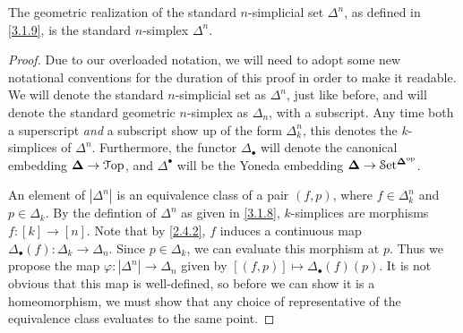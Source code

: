 \begin{proposition}\label{3.2.7}
    The geometric realization of the standard $n$-simplicial set $\Delta^n$, as defined in \cref{3.1.9}, is the standard $n$-simplex $\Delta^n$.
\end{proposition}
\begin{proof}
    Due to our overloaded notation, we will need to adopt some new notational conventions for the duration of this proof in order to make it readable. We will denote the standard $n$-simplicial set as $\Delta^n$, just like before, and will denote the standard geometric $n$-simplex as $\Delta_n$, with a subscript. Any time both a superscript \emph{and} a subscript show up of the form $\Delta^n_k$, this denotes the $k$-simplices of $\Delta^n$. Furthermore, the functor $\Delta_\bullet$ will denote the canonical embedding $\boldsymbol{\Delta}\to\mathcal{T}\mathrm{op}$, and $\Delta^\bullet$ will be the Yoneda embedding $\boldsymbol{\Delta}\to\mathcal{S}\mathrm{et}^{\boldsymbol{\Delta}^{\mathrm{op}}}$.

    An element of $\left|\Delta^n\right|$ is an equivalence class of a pair $(f,p)$, where $f\in\Delta_k^n$ and $p\in\Delta_k$. By the defintion of $\Delta^n$ as given in \cref{3.1.8}, $k$-simplices are morphisms $f : [k]\to[n]$. Note that by \cref{2.4.2}, $f$ induces a continuous map $\Delta_\bullet(f) : \Delta_k\to\Delta_n$. Since $p\in\Delta_k$, we can evaluate this morphism at $p$. Thus we propose the map $\varphi : \left|\Delta^n\right| \to\Delta_n$ given by $[(f,p)]\mapsto \Delta_\bullet(f)(p)$. It is not obvious that this map is well-defined, so before we can show it is a homeomorphism, we must show that any choice of representative of the equivalence class evaluates to the same point.


\end{proof}

